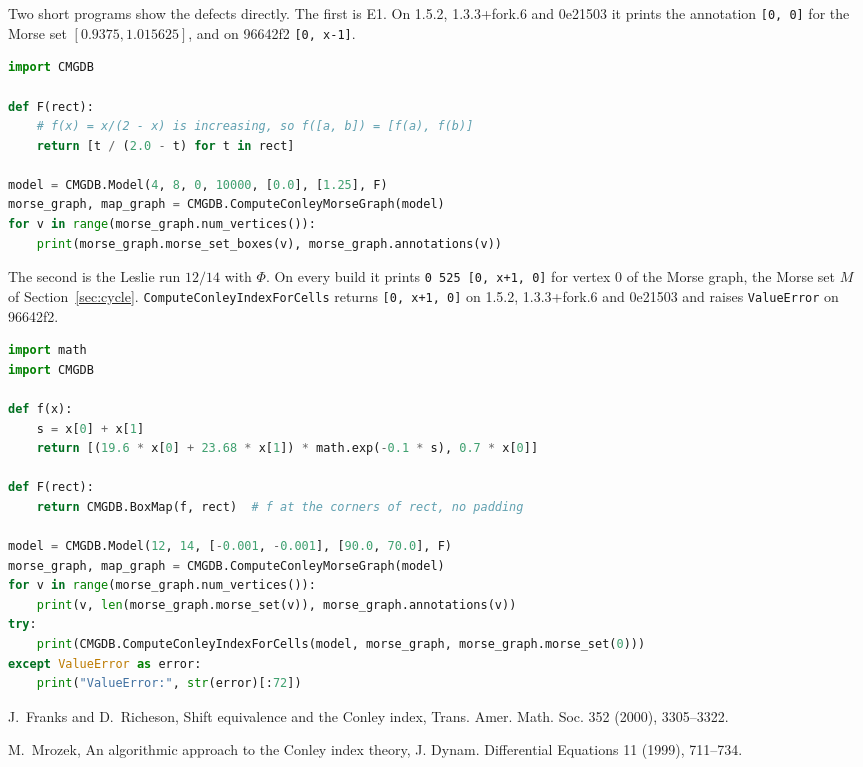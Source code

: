 \documentclass[11pt]{article}
\theoremstyle{plain}
\theoremstyle{definition}
\theoremstyle{remark}
\newcommand{\code}[1]{\texttt{#1}}
\begin{document}
Two short programs show the defects directly. The first is E1. On 1.5.2, 1.3.3+fork.6 and 0e21503 it prints the annotation \code{[\textquotesingle{}0\textquotesingle{}, \textquotesingle{}0\textquotesingle{}]} for the Morse set $[0.9375,1.015625]$, and on 96642f2 \code{[\textquotesingle{}0\textquotesingle{}, \textquotesingle{}x-1\textquotesingle{}]}.
\begin{lstlisting}[language=Python,numbers=none]
import CMGDB

def F(rect):
    # f(x) = x/(2 - x) is increasing, so f([a, b]) = [f(a), f(b)]
    return [t / (2.0 - t) for t in rect]

model = CMGDB.Model(4, 8, 0, 10000, [0.0], [1.25], F)
morse_graph, map_graph = CMGDB.ComputeConleyMorseGraph(model)
for v in range(morse_graph.num_vertices()):
    print(morse_graph.morse_set_boxes(v), morse_graph.annotations(v))
\end{lstlisting}
The second is the Leslie run $12/14$ with $\Phi$. On every build it prints \code{0 525 [\textquotesingle{}0\textquotesingle{}, \textquotesingle{}x+1\textquotesingle{}, \textquotesingle{}0\textquotesingle{}]} for vertex $0$ of the Morse graph, the Morse set $M$ of Section~\ref{sec:cycle}. \code{ComputeConleyIndexForCells} returns \code{[\textquotesingle{}0\textquotesingle{}, \textquotesingle{}x+1\textquotesingle{}, \textquotesingle{}0\textquotesingle{}]} on 1.5.2, 1.3.3+fork.6 and 0e21503 and raises \code{ValueError} on 96642f2.
\begin{lstlisting}[language=Python,numbers=none]
import math
import CMGDB

def f(x):
    s = x[0] + x[1]
    return [(19.6 * x[0] + 23.68 * x[1]) * math.exp(-0.1 * s), 0.7 * x[0]]

def F(rect):
    return CMGDB.BoxMap(f, rect)  # f at the corners of rect, no padding

model = CMGDB.Model(12, 14, [-0.001, -0.001], [90.0, 70.0], F)
morse_graph, map_graph = CMGDB.ComputeConleyMorseGraph(model)
for v in range(morse_graph.num_vertices()):
    print(v, len(morse_graph.morse_set(v)), morse_graph.annotations(v))
try:
    print(CMGDB.ComputeConleyIndexForCells(model, morse_graph, morse_graph.morse_set(0)))
except ValueError as error:
    print("ValueError:", str(error)[:72])
\end{lstlisting}

\begin{thebibliography}{9}

J.~Franks and D.~Richeson, Shift equivalence and the Conley index, Trans. Amer. Math. Soc. 352 (2000), 3305--3322.

M.~Mrozek, An algorithmic approach to the Conley index theory, J. Dynam. Differential Equations 11 (1999), 711--734.

\end{thebibliography}
\end{document}
